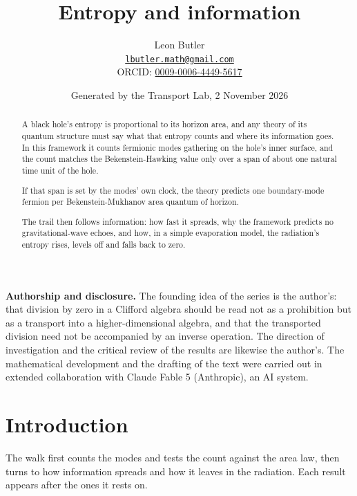 \documentclass[11pt]{article}
\title{\bfseries Entropy and information}
\author{Leon Butler\\ \normalsize\href{mailto:lbutler.math@gmail.com}{\texttt{lbutler.math@gmail.com}}\\ \normalsize ORCID: \href{https://orcid.org/0009-0006-4449-5617}{0009-0006-4449-5617}}
\date{Generated by the Transport Lab, 2 November 2026}
\theoremstyle{definition}
\theoremstyle{plain}
\begin{document}
\maketitle
\begin{abstract}
\normalsize
A black hole's entropy is proportional to its horizon area, and any theory of its quantum structure must say what that entropy counts and where its information goes. In this framework it counts fermionic modes gathering on the hole's inner surface, and the count matches the Bekenstein-Hawking value only over a span of about one natural time unit of the hole.

If that span is set by the modes' own clock, the theory predicts one boundary-mode fermion per Bekenstein-Mukhanov area quantum of horizon.

The trail then follows information: how fast it spreads, why the framework predicts no gravitational-wave echoes, and how, in a simple evaporation model, the radiation's entropy rises, levels off and falls back to zero.
\end{abstract}
\newpage
\noindent \textbf{Authorship and disclosure. }The founding idea of the series is the author's: that division by zero in a Clifford algebra should be read not as a prohibition but as a transport into a higher-dimensional algebra, and that the transported division need not be accompanied by an inverse operation. The direction of investigation and the critical review of the results are likewise the author's. The mathematical development and the drafting of the text were carried out in extended collaboration with Claude Fable 5 (Anthropic), an AI system.

\noindent{}
\newpage

\section*{Introduction}
The walk first counts the modes and tests the count against the area law, then turns to how information spreads and how it leaves in the radiation. Each result appears after the ones it rests on.
\end{document}
